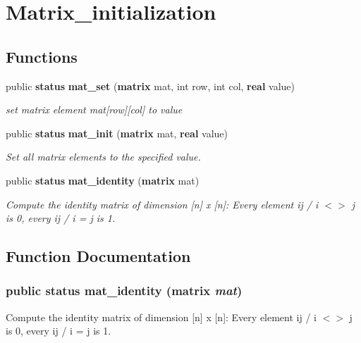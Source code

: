\section{Matrix\_\-initialization}
\label{group__matrix__initialization}
\subsection*{Functions}
\begin{CompactItemize}
\item 
public {\bf status} {\bf mat\_\-set} ({\bf matrix} mat, int row, int col, {\bf real} value)
\begin{CompactList}\small\item\em set matrix element mat[row][col] to value\item\end{CompactList}\item 
public {\bf status} {\bf mat\_\-init} ({\bf matrix} mat, {\bf real} value)
\begin{CompactList}\small\item\em Set all matrix elements to the specified value.\item\end{CompactList}\item 
public {\bf status} {\bf mat\_\-identity} ({\bf matrix} mat)
\begin{CompactList}\small\item\em Compute the identity matrix of dimension [n] x [n]: Every element ij / i $<$$>$ j is 0, every ij / i = j is 1.\item\end{CompactList}\end{CompactItemize}


\subsection{Function Documentation}
\subsubsection{\setlength{\rightskip}{0pt plus 5cm}public {\bf status} mat\_\-identity ({\bf matrix} {\em mat})}\label{group__matrix__initialization_a2}


Compute the identity matrix of dimension [n] x [n]: Every element ij / i $<$$>$ j is 0, every ij / i = j is 1.

